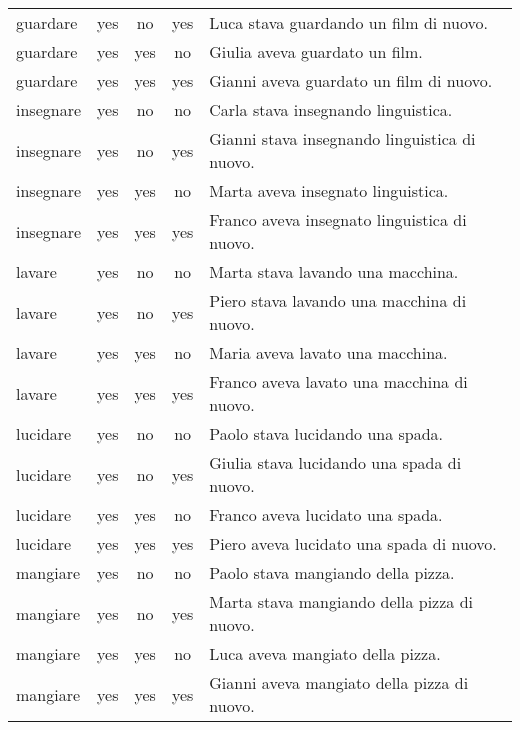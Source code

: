 \begin{longtable}{l|ccc|p{5cm}}
guardare       & yes  & no         & yes       & Luca stava guardando un film di nuovo.              \\
guardare       & yes  & yes        & no        & Giulia aveva guardato un film.                      \\
guardare       & yes  & yes        & yes       & Gianni aveva guardato un film di nuovo.             \\
insegnare      & yes  & no         & no        & Carla stava insegnando linguistica.                 \\
insegnare      & yes  & no         & yes       & Gianni stava insegnando linguistica di nuovo.       \\
insegnare      & yes  & yes        & no        & Marta aveva insegnato linguistica.                  \\
insegnare      & yes  & yes        & yes       & Franco aveva insegnato linguistica di nuovo.        \\
lavare         & yes  & no         & no        & Marta stava lavando una macchina.                   \\
lavare         & yes  & no         & yes       & Piero stava lavando una macchina di nuovo.          \\
lavare         & yes  & yes        & no        & Maria aveva lavato una macchina.                    \\
lavare         & yes  & yes        & yes       & Franco aveva lavato una macchina di nuovo.          \\
lucidare       & yes  & no         & no        & Paolo stava lucidando una spada.                    \\
lucidare       & yes  & no         & yes       & Giulia stava lucidando una spada di nuovo.          \\
lucidare       & yes  & yes        & no        & Franco aveva lucidato una spada.                    \\
lucidare       & yes  & yes        & yes       & Piero aveva lucidato una spada di nuovo.            \\
mangiare       & yes  & no         & no        & Paolo stava mangiando della pizza.                  \\
mangiare       & yes  & no         & yes       & Marta stava mangiando della pizza di nuovo.         \\
mangiare       & yes  & yes        & no        & Luca aveva mangiato della pizza.                    \\
mangiare       & yes  & yes        & yes       & Gianni aveva mangiato della pizza di nuovo.         \\

\end{longtable}
